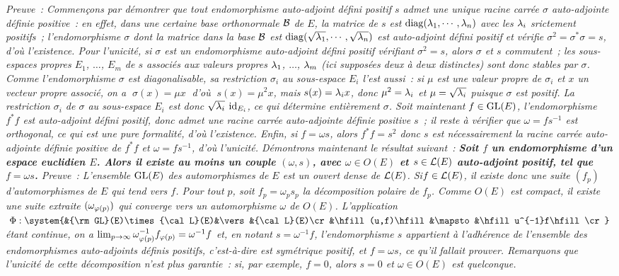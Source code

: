 \documentclass{article}
\begin{document}
{\it Preuve~: Commen\c cons par d\'emontrer que tout endomorphisme auto-adjoint d\'efini positif $s$ admet une unique racine carr\'ee $\sigma$ auto-adjointe d\'efinie positive~: en effet, dans une certaine base orthonormale ${\cal B}$ de $E$, la matrice de $s$ est $\mathop{\rm diag}\nolimits(\lambda_1,\cdots,\lambda_n)$ avec les $\lambda_i$ srictement positifs~; l'endomorphisme $\sigma$ dont la matrice dans la base ${\cal B}$ est $\mathop{\rm diag}\nolimits(\sqrt{\lambda_1},\cdots,\sqrt{\lambda_n})$ est auto-adjoint d\'efini positif et v\'erifie $\sigma^2=\sigma^*\sigma=s$, d'o\`u l'existence.\new
Pour l'unicit\'e, si $\sigma$ est un endomorphisme auto-adjoint d\'efini positif v\'erifiant $\sigma^2=s$, alors $\sigma$ et $s$ commutent~; les sous-espaces propres $E_1$, $\ldots$, $E_m$ de $s$ associ\'es aux valeurs propres $\lambda_1$, $\ldots$, $\lambda_m$ ({\it ici suppos\'ees deux \`a deux distinctes}) sont donc stables par $\sigma$. Comme l'endomorphisme $\sigma$ est diagonalisable, sa restriction $\sigma_i$ au sous-espace $E_i$ l'est aussi~: si $\mu$ est une valeur propre de $\sigma_i$ et $x$ un vecteur propre associ\'e, on a $\;\sigma(x)=\mu x\;$ d'o\`u $\;s(x)=\mu^2x$, mais $s(x)=\lambda_ix$, donc $\mu^2=\lambda_i$ et $\mu=\sqrt{\lambda_i}$ puisque $\sigma$ est positif. La restriction $\sigma_i$ de $\sigma$ au sous-espace $E_i$ est donc $\sqrt{\lambda_i}\>\mathop{\rm id}\nolimits_{E_i}$, ce qui d\'etermine enti\`erement $\sigma$.\ssk\sect
Soit maintenant $f\in{\rm GL}(E)$, l'endomorphisme $f^*f$ est auto-adjoint d\'efini positif, donc admet une racine carr\'ee auto-adjointe d\'efinie positive $s$~; il reste \`a v\'erifier que $\omega=fs^{-1}$ est orthogonal, ce qui est une pure formalit\'e, d'o\`u l'existence. Enfin, si $f=\omega s$, alors $f^*f=s^2$ donc $s$ est n\'ecessairement la racine carr\'ee auto-adjointe d\'efinie positive de $f^*f$ et $\omega=fs^{-1}$, d'o\`u l'unicit\'e.
\msk
D\'emontrons maintenant le r\'esultat suivant~:\ssk
{\bf Soit $f$ un endomorphisme d'un espace euclidien $E$. Alors il existe au moins un couple $(\omega,s)$, avec $\omega\in O(E)$ et $s\in{\cal L}(E)$ auto-adjoint positif, tel que $f=\omega s$.}\ssk
{\it Preuve~: L'ensemble ${\rm GL}(E)$ des automorphismes de $E$ est un ouvert dense de ${\cal L}(E)$. Si\break $f\in{\cal L}(E)$, il existe donc une suite $(f_p)$ d'automorphismes de $E$ qui tend vers $f$. Pour tout $p$, soit $f_p=\omega_p s_p$ la d\'ecomposition polaire de $f_p$. Comme $O(E)$ est compact, il existe une suite extraite $(\omega_{\varphi(p)})$ qui converge vers un automorphisme $\omega$ de $O(E)$. L'application $\;\Phi:\system{&{\rm GL}(E)\times{\cal L}(E)&\vers&{\cal L}(E)\cr &\hfill (u,f)\hfill&\mapsto&\hfill u^{-1}f\hfill\cr}\;$ \'etant continue, on a $\lim_{p\rightarrow\infty}\omega_{\varphi(p)}^{-1}f_{\varphi(p)}=\omega^{-1}f$ et, en notant $s=\omega^{-1}f$, l'endomorphisme $s$ appartient \`a l'adh\'erence de l'ensemble des endomorphismes auto-adjoints d\'efinis positifs, c'est-\`a-dire est sym\'etrique positif, et $f=\omega s$, ce qu'il fallait prouver.}
\ssk\sect
{\it Remarquons que l'unicit\'e de cette d\'ecomposition n'est plus garantie~: si, par exemple, $f=0$, alors $s=0$ et $\omega\in O(E)$ est quelconque.}}
\end{document}
